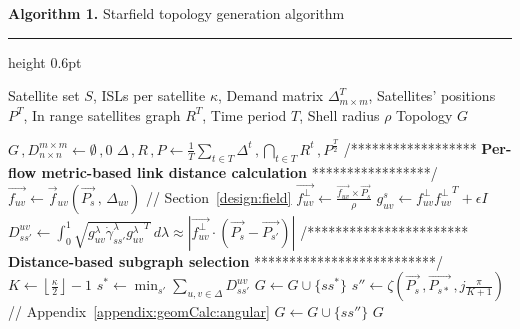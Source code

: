 \documentclass[acmsmall, screen]{acmart}
\begin{document}
\begin{center}
\begin{minipage}{\columnwidth}
\captionsetup{type=algorithm}

\begin{mdframed}[
  topline=true,
  bottomline=true,
  leftline=false,
  rightline=false,
  linewidth=0.6pt,
  skipabove=6pt,
  skipbelow=6pt,
  innertopmargin=6pt,
  innerbottommargin=6pt
]
\textbf{Algorithm 1.} Starfield topology generation algorithm \\[-0.5em]
\label{design:overview:algorithm}
\hrule height 0.6pt
\vspace{0.8em}

\begin{algorithmic}[1]
\Require Satellite set $S$, ISLs per satellite $\kappa$, Demand matrix $\Delta_{m \times m}^T$, Satellites' positions $P^T$, In range satellites graph $R^T$, Time period $T$, Shell radius $\rho$
\Ensure Topology $G$

\State $G \, ,D^{m \times m}_{n \times n} \leftarrow \emptyset \,, 0$
\State $\Delta \,, R \,, P \leftarrow \frac{1}{T}\sum_{t \in T} \Delta^t \,, \bigcap_{t \in T} R^t \,, P^{\frac{T}{2}}$
\State /****************** \textbf{Per-flow metric-based link distance calculation} *****************/
      \State $\vec{f_{uv}} \leftarrow \vec{f}_{uv}(\vec{P_s}\,,\,\Delta_{uv})$ \qquad // Section~\ref{design:field}
      \State $\vec{f^{\perp}_{uv}} \leftarrow \frac{\vec{f_{uv}} \times \vec{P_s}}{\rho} $ 
      \State $g^s_{uv} \leftarrow f_{uv}^{\perp}{f_{uv}^{\perp}}^T + \epsilon I$
      \State $D^{uv}_{ss'} \leftarrow \int_0^{1} \sqrt{g^{\lambda}_{uv}\dot{\gamma}^{\lambda}_{ss'}{g^{\lambda}_{uv}}^T}\,d\lambda \approx |\vec{f^{\perp}_{uv}} \cdot (\vec{P_s} - \vec{P_{s'}})| $
    \EndFor
\EndFor
\State /*********************** \textbf{Distance-based subgraph selection} **************************/
\State $K \leftarrow \left\lfloor\frac{\kappa}{2}\right\rfloor - 1$
    \State $s^* \leftarrow \min_{s'} \sum_{u,v \in \Delta}D^{uv}_{ss'}$
    \State $G \leftarrow G \cup \{ss^*\}$
        \State $s'' \leftarrow \zeta(\vec{P_s} \,, \vec{P_{s*}} \,, j\frac{\pi}{K+1})$ \qquad // Appendix~\ref{appendix:geomCalc:angular}
        \State $G \leftarrow G \cup \{ss''\}$
    \EndFor
\EndFor
\State \Return $G$
\end{algorithmic}
\end{mdframed}
\end{minipage}
\end{center}
\end{document}
